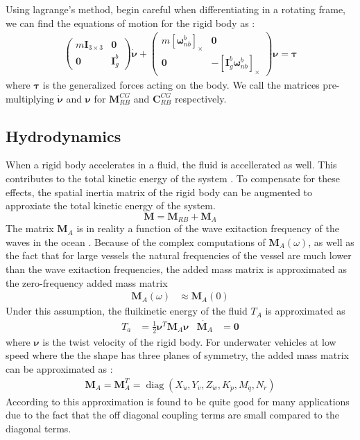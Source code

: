Using lagrange's method, begin careful when differentiating in a rotating frame,
we can find the equations of motion for the rigid body as \cite{fossen2021}:
\begin{align}
    \begin{pmatrix}
        m \bm{I}_{3\times 3} & \bm{0} \\
        \bm{0} & \bm{I}_g^b
    \end{pmatrix} \dot{\bm{\nu}}
    +
    \begin{pmatrix}
        m [\bm{\omega}_{nb}^b]_{\times} & \bm{0} \\
        \bm{0} & -[\bm{I}_g^b \bm{\omega}_{nb}^b]_{\times}
    \end{pmatrix} \bm{\nu} = \bm{\tau}
\end{align}
where $\bm{\tau}$ is the generalized forces acting on the body. We call the matrices
pre-multiplying $\dot{\bm{\nu}}$ and $\bm{\nu}$ for $\bm{M}_{RB}^{CG}$ and $\bm{C}_{RB}^{CG}$ respectively.



\subsection{Hydrodynamics}

When a rigid body accelerates in a fluid, the fluid is accellerated as well. 
This contributes to the total kinetic energy of the system \cite{antonelli2018}.
To compensate for these effects, the spatial inertia matrix of the rigid body
can be augmented to approxiate the total kinetic energy of the system. 
\begin{equation}
    \bm{M} = \bm{M}_{RB} + \bm{M}_{A}
\end{equation}
The matrix $\bm{M}_A$ is in reality a function of the wave exitaction frequency
of the waves in the ocean \cite{fossen2021}. Because of the complex computations
of $\bm{M}_A(\omega)$, as well as the fact that for large vessels the natural
frequencies of the vessel are much lower than the wave exitaction frequencies,
the added mass matrix is approximated as the zero-frequency added mass matrix
\begin{align}
    \bm{M}_A(\omega) &\approx \bm{M}_A(0)
\end{align}
Under this assumption, the fluikinetic energy of the fluid $T_A$ is approximated
as
\begin{align}
    T_a &= \frac{1}{2}\bm{\nu}^T\bm{M}_A\bm{\nu} & \dot{\bm{M}_A} &= \bm{0}
\end{align}
where $\bm{\nu}$ is the twist velocity of the rigid body. For underwater 
vehicles at low speed where the the shape has three planes of symmetry, the
added mass matrix can be approximated as \cite{fossen2021}:
\begin{align}
    \bm{M}_A = \bm{M}_A^T =
    \operatorname{diag}(X_{\dot{u}}, Y_{\dot{v}}, Z_{\dot{w}},
        K_{\dot{p}}, M_{\dot{q}}, N_{\dot{r}})
\end{align}
According to \cite{fossen2021} this approximation is found to be quite good for
many applications due to the fact that the off diagonal coupling terms are small
compared to the diagonal terms.

